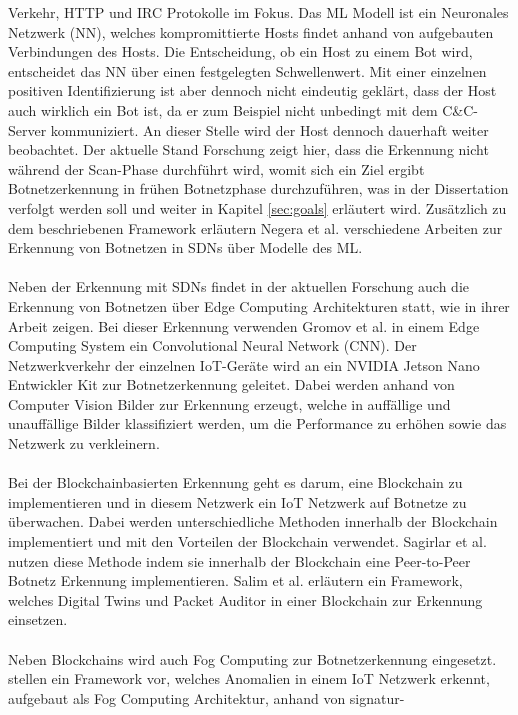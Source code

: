 Verkehr, HTTP und IRC Protokolle im Fokus. Das ML Modell ist ein Neuronales Netzwerk (NN), welches kompromittierte Hosts findet anhand von aufgebauten Verbindungen des Hosts. Die Entscheidung, 
ob ein Host zu einem Bot wird, entscheidet das NN über einen festgelegten Schwellenwert. Mit einer einzelnen positiven Identifizierung ist aber dennoch nicht eindeutig geklärt, dass der
Host auch wirklich ein Bot ist, da er zum Beispiel nicht unbedingt mit dem C\&C-Server kommuniziert. An dieser Stelle wird der Host dennoch dauerhaft weiter beobachtet. Der aktuelle Stand Forschung 
zeigt hier, dass die Erkennung nicht während der Scan-Phase durchführt wird, womit sich ein Ziel ergibt Botnetzerkennung in frühen Botnetzphase durchzuführen, was in der Dissertation verfolgt 
werden soll und weiter in Kapitel \ref{sec:goals} erläutert wird. Zusätzlich zu dem beschriebenen Framework erläutern Negera et al. \cite{DBLP:journals/sensors/NegeraSDMA22} verschiedene Arbeiten 
zur Erkennung von Botnetzen in SDNs über Modelle des ML. \\ \\ Neben der Erkennung mit SDNs findet in der aktuellen Forschung auch die Erkennung von Botnetzen über Edge Computing Architekturen 
statt, wie \cite{gromov2022edge} in ihrer Arbeit zeigen. Bei dieser Erkennung verwenden Gromov et al. in einem Edge Computing System ein Convolutional Neural Network (CNN). Der Netzwerkverkehr der 
einzelnen IoT-Geräte wird an ein NVIDIA Jetson Nano Entwickler Kit zur Botnetzerkennung geleitet. Dabei werden anhand von Computer Vision Bilder zur Erkennung erzeugt, welche in auffällige und 
unauffällige Bilder klassifiziert werden, um die Performance zu erhöhen sowie das Netzwerk zu verkleinern. \\ \\ Bei der Blockchainbasierten Erkennung geht es darum, eine Blockchain zu implementieren 
und in diesem Netzwerk ein IoT Netzwerk auf Botnetze zu überwachen. Dabei werden unterschiedliche Methoden innerhalb der Blockchain implementiert und mit den Vorteilen der Blockchain verwendet. 
Sagirlar et al. \cite{DBLP:journals/corr/abs-1809-10775} nutzen diese Methode indem sie innerhalb der Blockchain eine Peer-to-Peer Botnetz Erkennung implementieren. Salim et al. 
\cite{DBLP:journals/sensors/SalimATPP22} erläutern ein Framework, welches Digital Twins und Packet Auditor in einer Blockchain zur Erkennung einsetzen. \\ \\ Neben Blockchains wird auch Fog 
Computing zur Botnetzerkennung eingesetzt. \cite{Lawal2020AnAM} stellen ein Framework vor, welches Anomalien in einem IoT Netzwerk erkennt, aufgebaut als Fog Computing Architektur, anhand von signatur- 
